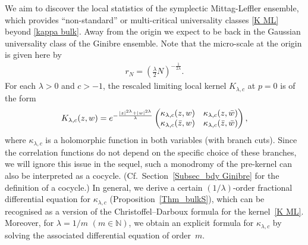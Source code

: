 \documentclass[11pt]{article}
\numberwithin{equation}{section}
\numberwithin{equation}{section}
\newcommand{\1}{\chi}
\begin{document}
We aim to discover the local statistics of the symplectic Mittag-Leffler ensemble, which provides ``non-standard'' or multi-critical universality classes \eqref{K ML} beyond \eqref{kappa bulk}.
Away from the origin we expect to be back in the Gaussian universality class of the Ginibre ensemble.
Note that the micro-scale at the origin is given here by
\begin{gather} \label{micro scale ML}
	r_N=\left(\frac{\lambda}{2}N\right)^{-\frac{1}{2\lambda}}.
\end{gather}
For each $\lambda>0$ and $c>-1$, the rescaled limiting local kernel $K_{\lambda,c}$ at $p=0$ is of the form
\begin{gather} \label{K ML}
	K_{\lambda,c}(z,w)
	={\rm e}^{ -\frac{ |z|^{2\lambda}+|w|^{2\lambda} }{\lambda} } \begin{pmatrix}
		\kappa_{\lambda,c}(z,w) & \kappa_{\lambda,c}(z,\bar{w}) \\
		\kappa_{\lambda,c}(\bar{z},w) & \kappa_{\lambda,c}(\bar{z},\bar{w})
	\end{pmatrix} ,
\end{gather}
where $\kappa_{\lambda,c}$ is a holomorphic function in both variables (with branch cuts).
Since the correlation functions do not depend on the specific choice of these branches, we will ignore this issue in the sequel, such a monodromy of the pre-kernel can also be interpreted as a cocycle. (Cf.\ Section~\ref{Subsec_bdy Ginibre} for the definition of a cocycle.)
In general, we derive a certain $(1/\lambda)$-order fractional differential equation for $\kappa_{\lambda,c}$ (Proposition~\ref{Thm_bulkS}), which can be recognised as a version of the Christoffel--Darboux formula for the kernel~\eqref{K ML}.
Moreover, for $\lambda=1/m$ $(m\in \mathbb{N})$, we obtain an explicit formula for $\kappa_{\lambda,c}$ by solving the associated differential equation of order~$m$.
\end{document}
